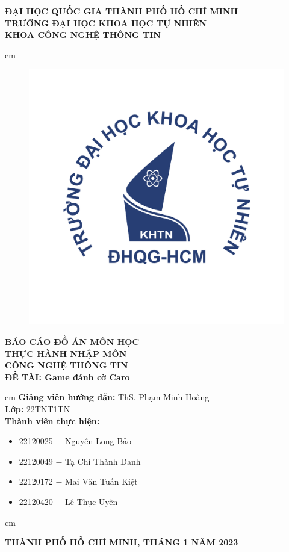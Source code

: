 \begin{titlepage}
\begin{mybox}
\begin{center}
\fontsize{12}{12}\selectfont
\textbf{ĐẠI HỌC QUỐC GIA THÀNH PHỐ HỒ CHÍ MINH}\\
\textbf{TRƯỜNG ĐẠI HỌC KHOA HỌC TỰ NHIÊN}\\
\textbf{KHOA CÔNG NGHỆ THÔNG TIN}
\end{center}
 cm
\begin{figure}[H]
\begin{center}
\includegraphics[scale=0.25]{images/logo}
\end{center}
\end{figure}
\begin{center}
\fontsize{18}{14}\selectfont
\textbf{BÁO CÁO ĐỒ ÁN MÔN HỌC}\\
\fontsize{26}{16}\selectfont
\textbf{THỰC HÀNH NHẬP MÔN\\ CÔNG NGHỆ THÔNG TIN}\\
\fontsize{18}{12}\selectfont
\textbf{ĐỀ TÀI: Game đánh cờ Caro}
\end{center}
 cm
\fontsize{14}{12}\selectfont
\textbf{Giảng viên hướng dẫn:} ThS. Phạm Minh Hoàng\\
\textbf{Lớp:} 22TNT1TN\\
\textbf{Thành viên thực hiện:}
\begin{itemize}
\item 22120025 $-$ Nguyễn Long Bảo
\item 22120049 $-$ Tạ Chí Thành Danh
\item 22120172 $-$ Mai Văn Tuấn Kiệt
\item 22120420 $-$ Lê Thục Uyên
\end{itemize}
 cm
\begin{center}
\textbf{THÀNH PHỐ HỒ CHÍ MINH, THÁNG 1 NĂM 2023}
\end{center}
\end{mybox}
\end{titlepage}